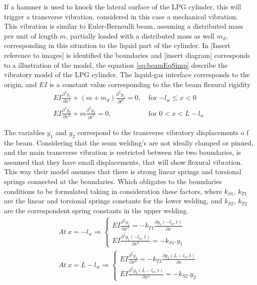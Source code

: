 If a hammer is used to knock the lateral surface of the LPG cylinder, this will trigger a transverse vibration, considered in this case a mechanical vibration. This vibration is similar to Euler-Bernoulli beam, assuming a distributed mass per unit of length $m$, partially loaded with a distributed mass as well $m_d$, corresponding in this situation to the liquid part of the cylinder. In [Insert reference to images] is identified the boundaries and [insert diagram] corresponds to a illustration of the model, the  equation \ref{eq:beamEqSimp} describe the vibratory model of the LPG cylinder. The liquid-gas interface corresponds to the origin, and $EI$ is a constant value corresponding to the the beam flexural rigidity
\begin{equation} \label{eq:beamEqSimp}
    \begin{split}
        EI\frac{\partial^4y_1}{\partial x^4} + (m + m_d)\frac{\partial^2y_1}{\partial t^2} = 0,\> & \text{for $-l_w \leq x < 0$} \\
        EI\frac{\partial^4y_2}{\partial x^4} + m\frac{\partial^2y_2}{\partial t^2} = 0,\> & \text{for $0 < x < L-l_w$}
    \end{split}
\end{equation}

The variables $y_1$ and $y_2$ correspond to the transverse vibratory displacements o f the beam. Considering that the seam welding's are not ideally clamped or pinned, and the main transverse vibration is restricted between the two boundaries, is assumed that they have small displacements, that will show flexural vibration. This way their model assumes that there is strong linear springs and torsional springs connected at the boundaries. Which obligates to the boundaries conditions to be formulated taking in consideration these factors, where $k_{S1}$, $k_{T1}$ are the linear and torsional springs constants for the lower welding, and $k_{S2}$, $k_{T2}$ are the correspondent spring constants in the upper welding.
\begin{equation} \label{eq:beamEqEv}
    \begin{split}
        At\>x=-l_w \Rightarrow \begin{cases}
            EI\frac{\partial^2y_1}{\partial x^2} = -k_{T1}\frac{\partial y_1(-l_w,t)}{\partial x}\\
            EI\frac{\partial^3y_1(-l_w,t)}{\partial x^3}=-k_{S1}.y_1    
        \end{cases}\\
        At\>x=L-l_w \Rightarrow \begin{cases}
            EI\frac{\partial^2y_2}{\partial x^2} = -k_{T2}\frac{\partial y_2(L-l_w,t)}{\partial x}\\
            EI\frac{\partial^3y_2(L-l_w,t)}{\partial x^3}=-k_{S2}.y_2    
        \end{cases}    
    \end{split}
\end{equation}

